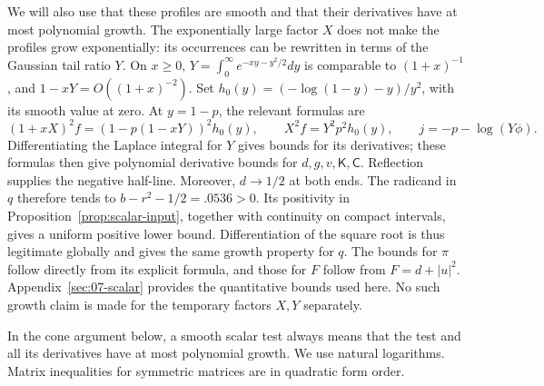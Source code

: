 We will also use that these profiles are smooth and that their derivatives
have at most polynomial growth. The exponentially large factor \(X\) does
not make the profiles grow exponentially: its occurrences can be rewritten
in terms of the Gaussian tail ratio \(Y\). On \(x\ge0\),
\(Y=\int_0^\infty e^{-xy-y^2/2}dy\) is comparable to \((1+x)^{-1}\),
and \(1-xY=O((1+x)^{-2})\). Set
\(h_0(y)=(-\log(1-y)-y)/y^2\), with its smooth value at zero.
At \(y=1-p\), the relevant formulas are
\[
 (1+xX)^2f=(1-p(1-xY))^2h_0(y),\qquad
 X^2f=Y^2p^2h_0(y),\qquad j=-p-\log(Y\phi).
\]
Differentiating the Laplace integral for \(Y\) gives bounds for its
derivatives; these formulas then give polynomial derivative bounds for
\(d,g,v,\mathsf K,\mathsf C\). Reflection supplies the negative half-line.
Moreover, \(d\to1/2\) at both ends. The radicand in \(q\) therefore
tends to \(b-r^2-1/2=.0536>0\). Its positivity in
Proposition~\ref{prop:scalar-input}, together with continuity on compact
intervals, gives a uniform positive lower bound. Differentiation of the
square root is thus legitimate globally and gives the same growth property
for \(q\). The bounds for \(\pi\) follow directly from its explicit
formula, and those for \(F\) follow from \(F=d+|u|^2\).
Appendix~\ref{sec:07-scalar}
provides the quantitative bounds used here. No such growth claim is made
for the temporary factors \(X,Y\) separately.

In the cone argument below, a smooth scalar test always means that the
test and all its derivatives have at most polynomial growth. We use
natural logarithms. Matrix inequalities for symmetric matrices are in
quadratic form order.
